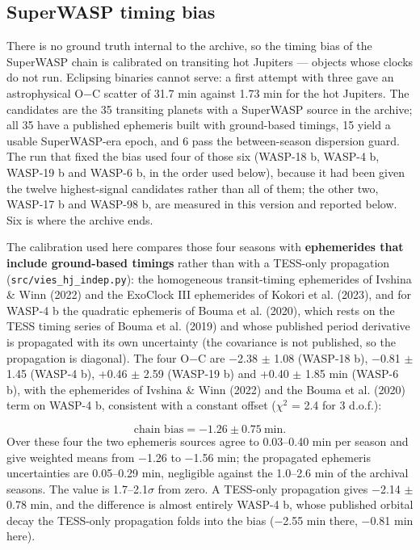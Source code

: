 \documentclass{aa}
\begin{document}
\subsection{SuperWASP timing bias}\label{ss:vies}
There is no ground truth internal to the archive, so the timing bias of the SuperWASP chain is calibrated on transiting hot Jupiters --- objects whose clocks do not run. Eclipsing binaries cannot serve: a first attempt with three gave an astrophysical O$-$C scatter of 31.7 min against 1.73 min for the hot Jupiters. The candidates are the 35 transiting planets with a SuperWASP source in the archive; all 35 have a published ephemeris built with ground-based timings, 15 yield a usable SuperWASP-era epoch, and 6 pass the between-season dispersion guard. The run that fixed the bias used four of those six (WASP-18 b, WASP-4 b, WASP-19 b and WASP-6 b, in the order used below), because it had been given the twelve highest-signal candidates rather than all of them; the other two, WASP-17 b and WASP-98 b, are measured in this version and reported below. Six is where the archive ends.

The calibration used here compares those four seasons with \textbf{ephemerides that include ground-based timings} rather than with a TESS-only propagation (\texttt{src/\allowbreak vies\_\allowbreak hj\_\allowbreak indep.py}): the homogeneous transit-timing ephemerides of Ivshina \& Winn (2022) and the ExoClock III ephemerides of Kokori et al. (2023), and for WASP-4 b the quadratic ephemeris of Bouma et al. (2020), which rests on the TESS timing series of Bouma et al. (2019) and whose published period derivative is propagated with its own uncertainty (the covariance is not published, so the propagation is diagonal). The four O$-$C are $-$2.38 $\pm$ 1.08 (WASP-18 b), $-$0.81 $\pm$ 1.45 (WASP-4 b), +0.46 $\pm$ 2.59 (WASP-19 b) and +0.40 $\pm$ 1.85 min (WASP-6 b), with the ephemerides of Ivshina \& Winn (2022) and the Bouma et al. (2020) term on WASP-4 b, consistent with a constant offset ($\chi^2$ = 2.4 for 3 d.o.f.):

\begin{equation}
\text{chain bias} = -1.26 \pm 0.75\ \mathrm{min}.
\end{equation}
Over these four the two ephemeris sources agree to 0.03--0.40 min per season and give weighted means from $-$1.26 to $-$1.56 min; the propagated ephemeris uncertainties are 0.05--0.29 min, negligible against the 1.0--2.6 min of the archival seasons. The value is 1.7--2.1$\sigma$ from zero. A TESS-only propagation gives $-$2.14 $\pm$ 0.78 min, and the difference is almost entirely WASP-4 b, whose published orbital decay the TESS-only propagation folds into the bias ($-$2.55 min there, $-$0.81 min here).
\end{document}
